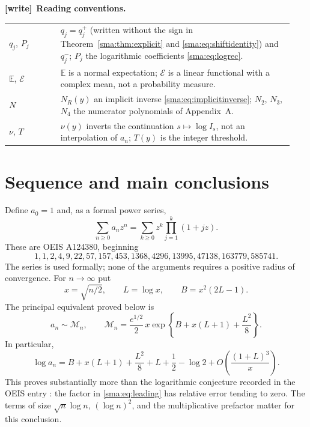 \documentclass[11pt,letterpaper]{article}
\numberwithin{equation}{section}
\newcommand{\E}{\mathbb E}\newcommand{\ii}{\mathrm i}\newcommand{\M}{\mathcal M}\newcommand{\dd}{\,\mathrm dt}\newcommand{\C}{\mathbb C}
\newenvironment{writenote}[1][]{\par\smallskip\begingroup\small
 \noindent\textbf{[write]}\if\relax\detokenize{#1}\relax\else~\textbf{#1.}\fi\ }%
 {\par\endgroup\smallskip}
\begin{document}
\begin{writenote}[Reading conventions]
\begin{tabular}{@{}>{\raggedright\arraybackslash}p{0.17\linewidth}
 >{\raggedright\arraybackslash}p{0.77\linewidth}@{}}
$q_j$, $P_j$ & $q_j=q_j^+$ (written without the sign in
 Theorem~\ref{sma:thm:explicit} and \eqref{sma:eq:shiftidentity}) and
 $q_j^-$; $P_j$ the logarithmic coefficients \eqref{sma:eq:logrec}. \\
$\E$, $\mathcal E$ & $\E$ is a normal expectation; $\mathcal E$ is a linear
 functional with a complex mean, not a probability measure. \\
$N$ & $N_R(y)$ an implicit inverse \eqref{sma:eq:implicitinverse}; $N_2$,
 $N_3$, $N_4$ the numerator polynomials of Appendix~A. \\
$\nu$, $T$ & $\nu(y)$ inverts the continuation $s\mapsto\log I_s$, not an
 interpolation of $a_n$; $T(y)$ is the integer threshold. \\
\bottomrule
\end{tabular}
\end{writenote}

\section{Sequence and main conclusions}
Define $a_0=1$ and, as a formal power series,
\begin{equation}\label{sma:eq:gf}
 \sum_{n\ge0}a_nz^n=\sum_{k\ge0}z^k\prod_{j=1}^k(1+jz).
\end{equation}
These are OEIS A124380, beginning
\[
1,1,2,4,9,22,57,157,453,1368,4296,13995,47138,163779,585741.
\]
The series is used formally; none of the arguments requires a positive radius of convergence. For $n\to\infty$ put
\begin{equation}\label{sma:eq:xL}
 x=\sqrt{n/2},\qquad L=\log x,\qquad B=x^2(2L-1).
\end{equation}
The principal equivalent proved below is
\begin{equation}\label{sma:eq:leading}
 a_n\sim\M_n,
 \qquad \M_n=\frac{e^{1/2}}2\,x\exp\left\{B+x(L+1)+\frac{L^2}{8}\right\}.
\end{equation}
In particular,
\begin{equation}\label{sma:eq:logsummary}
 \log a_n=B+x(L+1)+\frac{L^2}{8}+L+\frac12-\log2
 +O\!\left(\frac{(1+L)^3}{x}\right).
\end{equation}
This proves substantially more than the logarithmic conjecture recorded in the OEIS entry \cite{oeis}: the factor in \eqref{sma:eq:leading} has relative error tending to zero. The terms of size $\sqrt n\log n$, $(\log n)^2$, and the multiplicative prefactor matter for this conclusion.
\end{document}
